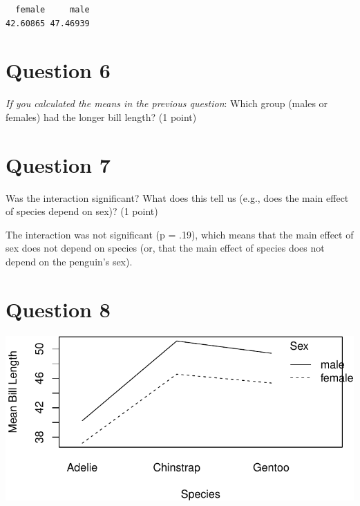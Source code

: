 \documentclass[
  letterpaper,
  DIV=11,
  numbers=noendperiod]{scrartcl}
\newenvironment{Shaded}{\begin{snugshade}}{\end{snugshade}}
\newcommand{\AttributeTok}[1]{\textcolor[rgb]{0.40,0.45,0.13}{#1}}
\newcommand{\FunctionTok}[1]{\textcolor[rgb]{0.28,0.35,0.67}{#1}}
\newcommand{\NormalTok}[1]{\textcolor[rgb]{0.00,0.23,0.31}{#1}}
\newcommand{\SpecialCharTok}[1]{\textcolor[rgb]{0.37,0.37,0.37}{#1}}
\newcommand{\StringTok}[1]{\textcolor[rgb]{0.13,0.47,0.30}{#1}}
\begin{document}
\begin{verbatim}
  female     male 
42.60865 47.46939 
\end{verbatim}

\section{Question 6}\label{question-6}

\emph{If you calculated the means in the previous question}: Which group
(males or females) had the longer bill length? (1 point)

\section{Question 7}\label{question-7}

Was the interaction significant? What does this tell us (e.g., does the
main effect of species depend on sex)? (1 point)

\textcolor[RGB]{178,34,34}{The interaction was not significant (p =
.19), which means that the main effect of sex does not depend on species
(or, that the main effect of species does not depend on the penguin's
sex).}

\section{Question 8}\label{question-8}

\begin{Shaded}
\end{Shaded}

\includegraphics{103bA5_files/figure-pdf/unnamed-chunk-5-1.pdf}
\end{document}
